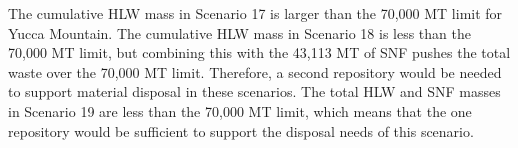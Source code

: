 The cumulative \gls{HLW} mass in Scenario 17 is larger than the 70,000
MT limit for Yucca Mountain. The cumulative \gls{HLW} mass 
in Scenario 18 is less than the 70,000 MT limit, but combining this with 
the 43,113 MT of \gls{SNF} pushes the total waste over the 70,000 MT 
limit. Therefore, a second repository would be needed to support 
material disposal in these scenarios. The total \gls{HLW} and \gls{SNF} 
masses in Scenario 19 are less than the 70,000 MT limit, which means 
that the one repository would be sufficient to support the disposal 
needs of this scenario. 